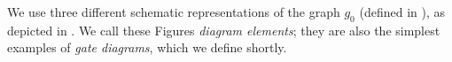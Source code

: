 \documentclass[../thesis-main/thesis-main]{subfiles}
\begin{document}
We use three different schematic representations of the graph $g_{0}$ (defined in ), as depicted in . We call these Figures \emph{diagram elements}; they are also the simplest examples of \emph{gate diagrams}, which we define shortly.

%
\end{document}
